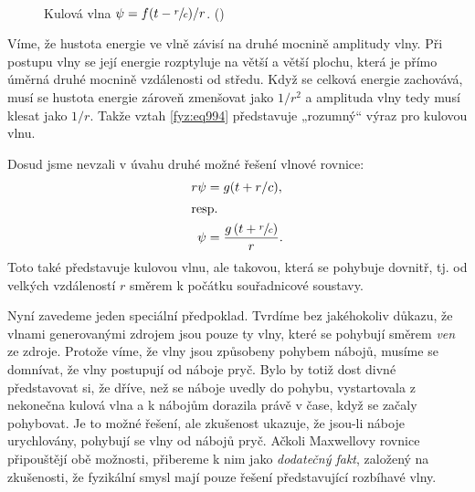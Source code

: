     \begin{figure}[ht!] %
      \centering
                                  \\
      \caption{Kulová vlna \(\psi=f(t-\sfrac{r}{c})/r\). (\cite[s.~366]{Feynman02})}
      \label{fyz:fig0649}
    \end{figure}

    Víme, že hustota energie ve vlně závisí na druhé mocnině amplitudy vlny. Při postupu vlny se
    její energie rozptyluje na větší a větší plochu, která je přímo úměrná druhé mocnině vzdálenosti
    od středu. Když se celková energie zachovává, musí se hustota energie zároveň zmenšovat jako
    \(1/r^2\) a amplituda vlny tedy musí klesat jako \(1/r\). Takže vztah \eqref{fyz:eq994}
    představuje „rozumný“ výraz pro kulovou vlnu.
    
    Dosud jsme nevzali v úvahu druhé možné řešení vlnové rovnice:
    \begin{align*}
      r\psi &=g(t+r/c), \\
      \shortintertext{resp.}
      \psi  &=\dfrac{g\left(t + \sfrac{r}{c}\right)}{r}.
    \end{align*}
    Toto také představuje kulovou vlnu, ale takovou, která se pohybuje dovnitř, tj. od velkých
    vzdáleností \(r\) směrem k počátku souřadnicové soustavy.
    
    Nyní zavedeme jeden speciální předpoklad. Tvrdíme bez jakéhokoliv důkazu, že vlnami generovanými
    zdrojem jsou pouze ty vlny, které se pohybují směrem \emph{ven} ze zdroje. Protože víme, že vlny
    jsou způsobeny pohybem nábojů, musíme se domnívat, že vlny postupují od náboje pryč. Bylo by
    totiž dost divné představovat si, že dříve, než se náboje uvedly do pohybu, vystartovala z
    nekonečna kulová vlna a k nábojům dorazila právě v čase, když se začaly pohybovat. Je to možné
    řešení, ale zkušenost ukazuje, že jsou-li náboje urychlovány, pohybují se vlny od nábojů pryč.
    Ačkoli Maxwellovy rovnice připouštějí obě možnosti, přibereme k nim jako \emph{dodatečný fakt},
    založený na zkušenosti, že fyzikální smysl mají pouze řešení představující rozbíhavé vlny.
    
